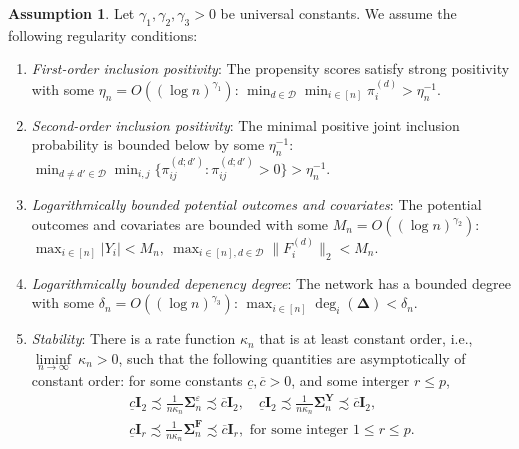 \documentclass{article}
\theoremstyle{plain}
\theoremstyle{definition}
\newtheorem{assumption}[theorem]{Assumption}
\theoremstyle{remark}
\newcommand{\bY}{\boldsymbol{Y}}
\newcommand{\bF}{\boldsymbol{F}}
\newcommand{\bI}{\boldsymbol{I}}
\newcommand{\bSigma}{\boldsymbol{\Sigma}}
\newcommand{\bDelta}{\boldsymbol{\Delta}}
\newcommand{\cD}{\mathcal{D}}
\begin{document}
\begin{assumption}
    Let $\gamma_1, \gamma_2, \gamma_3 > 0$ be universal constants. We assume the following regularity conditions: 
    \begin{enumerate}[label=(\alph*), ref=\theassumption (\alph*)]
        \item \label{asp::positivity_a} \textit{  First-order inclusion positivity}: The propensity scores satisfy strong positivity with some  $\eta_n = O((\log n)^{\gamma_1})$: $
        \min_{d\in\cD} \min_{i\in[n]} \pi_i^{(d)} > \eta_n^{-1}$.

        \item \label{asp::positivity_b} \textit{Second-order inclusion positivity}: The minimal positive joint inclusion probability is bounded below by some $\eta_n^{-1}$: $\min_{d\neq d'\in\cD} \min_{i,j} \{\pi_{ij}^{(d;d')}: \pi_{ij}^{(d;d')} > 0\} > \eta_n^{-1}$. 

        \item \label{asp::bound} \textit{Logarithmically bounded potential outcomes and covariates}: The potential outcomes and covariates are bounded with some $M_n = O((\log n)^{\gamma_2})$: $\max_{i\in[n]} |Y_i| < M_n, ~ \max_{i\in[n], d\in\cD} \|F_i^{(d)}\|_2 < M_n$.

        \item \label{asp::bounded_degree} \textit{Logarithmically bounded depenency degree}: The network has a bounded degree with some $\delta_n = O((\log n)^{\gamma_3})$: $\max_{i\in[n]} \deg_i(\bDelta) < \delta_n$.

        \item \label{asp::stability} \textit{Stability}: 
        There is a rate function $\kappa_n$ that is at least constant order, i.e., $ \underset{n\to\infty}{\liminf} ~\kappa_n > 0$, such that the following quantities are asymptotically of constant order: for some constants $\underline{c}, \overline{c} > 0$, and some interger $r \le p$,
        \begin{gather}
            \underline{c}\bI_2\precsim\frac{1}{n\kappa_n}\bSigma^{\varepsilon}_n \precsim \overline{c}\bI_2, \quad \underline{c}\bI_2\precsim\frac{1}{n\kappa_n}\bSigma^{\bY}_n \precsim \overline{c}\bI_2, \\ \underline{c}\bI_r\precsim\frac{1}{n\kappa_n}\bSigma^{\bF}_n \precsim \overline{c}\bI_r, \text{ for some integer } 1 \le r \le p .
        \end{gather}
    \end{enumerate}
\end{assumption}
\end{document}
